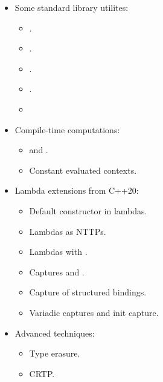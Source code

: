 \begin{itemize}
  \item Some standard library utilites:
    \begin{itemize}
      \item {}.
      \item {}.
      \item {}.
      \item {}.
      \item {}
    \end{itemize}
  \item Compile-time computations:
    \begin{itemize}
      \item {} and .
      \item Constant evaluated contexts.
    \end{itemize}
  \item Lambda extensions from C++20:
    \begin{itemize}
      \item Default constructor in lambdas.
      \item Lambdas as NTTPs.
      \item Lambdas with .
      \item Captures \cppkey{[=,this]} and \cppkey{[*this]}.
      \item Capture of structured bindings.
      \item Variadic captures and init capture.
    \end{itemize}
  \item Advanced techniques:
    \begin{itemize}
      \item Type erasure.
      \item CRTP.
    \end{itemize}
\end{itemize}
